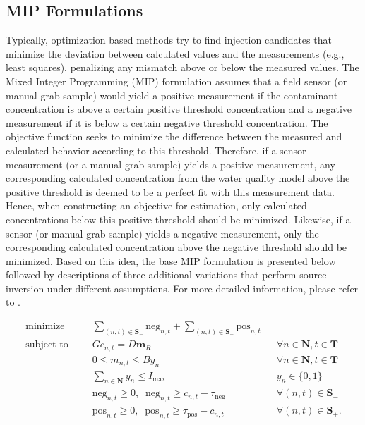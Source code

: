\subsection{MIP Formulations}
Typically, optimization based methods try to find injection candidates
that minimize the deviation between calculated values and the
measurements (e.g., least squares), penalizing any mismatch above or
below the measured values. The Mixed Integer Programming (MIP)
formulation assumes that a field sensor (or manual grab sample) would
yield a positive measurement if the contaminant concentration is above
a certain positive threshold concentration and a negative measurement
if it is below a certain negative threshold concentration. The
objective function seeks to minimize the difference between the
measured and calculated behavior according to this threshold.
Therefore, if a sensor measurement (or a manual grab sample) yields a
positive measurement, any corresponding calculated concentration from
the water quality model above the positive threshold is deemed to be a
perfect fit with this measurement data. Hence, when constructing
an objective for estimation, only calculated concentrations below this
positive threshold should be minimized. Likewise, if a sensor (or
manual grab sample) yields a negative measurement, only the
corresponding calculated concentration above the negative threshold
should be minimized. Based on this idea, the base MIP formulation is presented below 
followed by descriptions of three additional variations that perform source
inversion under different assumptions. 
For more detailed information, please refer to \citet{Mann1}.


\label{sec.mip_formulation}
\begin{align}
\textrm{minimize}\qquad &\sum_{(n,t) \in \mathbf{S}_-}\mathrm{neg}_{n,t} + \sum_{(n,t) \in \mathbf{S}_+}\mathrm{pos}_{n,t} \label{eqn.milp_first_egn}\\
\textrm{subject to}\quad &Gc_{n,t} = D\mathbf{m}_R &&\forall n \in \mathbf{N}, t\in \mathbf{T} \label{eqn.milp_merlion_model}\\
&0 \le m_{n,t} \le By_n &&\forall n \in \mathbf{N},
t\in \mathbf{T} \label{eqn.milp_big_m}\\
&\sum_{n \in \mathbf{N}} y_n \le I_{\max} && y_n \in \lbrace
0,1 \rbrace \label{eqn.inj_constraints}\\ &\mathrm{neg}_{n,t} \geq 0, \;\;
\mathrm{neg}_{n,t} \geq c_{n,t}-\tau _\mathrm{neg} &&\forall \left(
n,t \right) \in \mathbf{S}_- \label{eqn.milp_negative_set}\\
&\mathrm{pos}_{n,t} \geq 0, \;\; \mathrm{pos}_{n,t} \geq \tau _\mathrm{pos} -c_{n,t}
&&\forall \left(
n,t \right) \in \mathbf{S}_+. \label{eqn.milp_positive_set}
\end{align}

